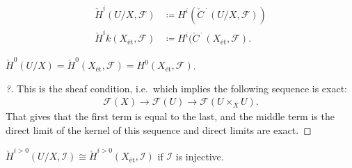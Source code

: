 \begin{definition}\label{def:cech_cohomology}

\begin{align*}  
\check{H}^i(U/X, \mathcal{F}) &\coloneqq H^i(\check{C}^{\,\cdot\,}(U/X, \mathcal{F})) \\
\check{H}^ik(X_\text{ét}, \mathcal{F}) &\coloneqq H^i(\check{C}^{\,\cdot\,}(X_\text{ét}, \mathcal{F})
.\end{align*}

\end{definition}

\begin{proposition}[?]

\({\check{H}}^0(U/X) = {\check{H}}^0(X_\text{ét}, \mathcal{F}) = H^0(X_\text{ét}, \mathcal{F})\).

\end{proposition}

\begin{proof}[?]

This is the sheaf condition, i.e.~which implies the following sequence
is exact:
\begin{align*}  
\mathcal{F}(X) \to \mathcal{F}(U) \to \mathcal{F}(U\times_X U)
.\end{align*}
That gives that the first term is equal to the last, and the middle term
is the direct limit of the kernel of this sequence and direct limits are
exact.

\end{proof}

\begin{proposition}[?]

\({\check{H}}^{i> 0} (U/X, \mathcal{I}) \cong {\check{H}}^{i> 0}(X_\text{ét}, \mathcal{I})\)
if \(\mathcal{I}\) is injective.

\end{proposition}

